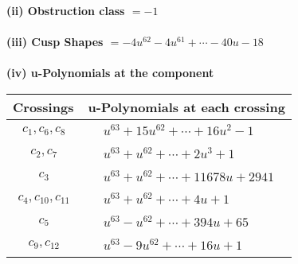 \documentclass[1p]{elsarticle_modified}
\theoremstyle{definition}
\begin{document}
\flushleft \textbf{(ii) Obstruction class $= -1$}\\~\\
\flushleft \textbf{(iii) Cusp Shapes $= -4 u^{62}-4 u^{61}+\cdots-40 u-18$}\\~\\
\newpage\renewcommand{\arraystretch}{1}
\flushleft \textbf{(iv) u-Polynomials at the component}\newline \\
\begin{tabular}{m{50pt}|m{274pt}}
Crossings & \hspace{64pt}u-Polynomials at each crossing \\
\hline $$\begin{aligned}c_{1},c_{6},c_{8}\end{aligned}$$&$\begin{aligned}
&u^{63}+15 u^{62}+\cdots+16 u^2-1
\end{aligned}$\\
\hline $$\begin{aligned}c_{2},c_{7}\end{aligned}$$&$\begin{aligned}
&u^{63}+u^{62}+\cdots+2 u^3+1
\end{aligned}$\\
\hline $$\begin{aligned}c_{3}\end{aligned}$$&$\begin{aligned}
&u^{63}+u^{62}+\cdots+11678 u+2941
\end{aligned}$\\
\hline $$\begin{aligned}c_{4},c_{10},c_{11}\end{aligned}$$&$\begin{aligned}
&u^{63}+u^{62}+\cdots+4 u+1
\end{aligned}$\\
\hline $$\begin{aligned}c_{5}\end{aligned}$$&$\begin{aligned}
&u^{63}- u^{62}+\cdots+394 u+65
\end{aligned}$\\
\hline $$\begin{aligned}c_{9},c_{12}\end{aligned}$$&$\begin{aligned}
&u^{63}-9 u^{62}+\cdots+16 u+1
\end{aligned}$\\
\hline
\end{tabular}\\~\\
\end{document}
